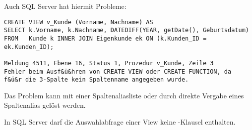 \clearpage
Auch SQL Server hat hiermit Probleme:
\begin{lstlisting}[language=ms_sql,caption={Eine View mit einer berechneten Spalte in SQL Server},label=sql08_34]
CREATE VIEW v_Kunde (Vorname, Nachname) AS
SELECT k.Vorname, k.Nachname, DATEDIFF(YEAR, getDate(), Geburtsdatum)
FROM   Kunde k INNER JOIN Eigenkunde ek ON (k.Kunden_ID = ek.Kunden_ID);

Meldung 4511, Ebene 16, Status 1, Prozedur v_Kunde, Zeile 3
Fehler beim Ausf&ü&hren von CREATE VIEW oder CREATE FUNCTION, da
f&ü&r die 3-Spalte kein Spaltenname angegeben wurde.
        \end{lstlisting}
Das Problem kann mit einer Spaltenaliasliste oder durch direkte Vergabe eines Spaltenalias gelöst werden.

\begin{merke}
    In SQL Server darf die Auswahlabfrage einer View keine \ORDERBY-Klausel enthalten.
\end{merke}
